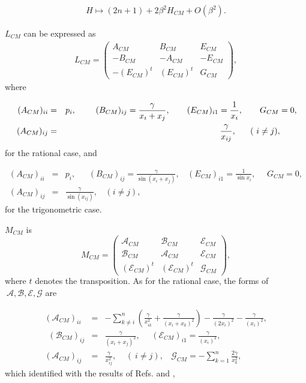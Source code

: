 \documentclass[a4paper,12pt]{article}
\begin{document}
\begin{eqnarray}
H\longmapsto (2n+1)+2\beta ^{2}H_{CM}+O(\beta ^{2}).
\end{eqnarray}

$L_{CM}$ can be expressed as
\begin{eqnarray}
L_{CM}=\left(
\begin{array}{lll}
A_{CM} & B_{CM} & E_{CM} \\
-B_{CM} & -A_{CM} & -E_{CM} \\
-(E_{CM})^{t} & (E_{CM})^{t} & G_{CM}
\end{array}
\right),
\end{eqnarray}
where

\begin{eqnarray}
\ (A_{CM})_{ii} &=&p_{i},\ \ \ \ \ \ \ (B_{CM})_{ij}=\frac{\gamma }{%
x_{i}+x_{j}},\ \ \ \ \ \ (E_{CM})_{i1}=\frac{1}{x_{i}},\ \ \ \ \ \ G_{CM}=0,
\nonumber \\
(A_{CM})_{ij} &=&\frac{\gamma }{x_{ij}},\ \ \ \ \ (\ i\neq j),\ \ \ \ \ \
\end{eqnarray}
for the rational case, and

\begin{eqnarray}
(A_{CM})_{ii} &=&p_{i},\ \ \ \ \ \ \ (B_{CM})_{ij}=\frac{\gamma }{\sin
(x_{i}+x_{j})},\ \ \ \ (E_{CM})_{i1}=\frac{1}{\sin x_{i}},\ \ \ \ \ \
G_{CM}=0,  \nonumber \\
(A_{CM})_{ij} &=&\frac{\gamma }{\sin (x_{ij})},\ \ \ \ (i\neq
j),
\end{eqnarray}
for the trigonometric case.

$M_{CM}$ is
\begin{equation}
M_{CM}=\left(
\begin{array}{lll}
\mathcal{A}_{CM} & \mathcal{B}_{CM} & \mathcal{E}_{CM} \\
\mathcal{B}_{CM} & \mathcal{A}_{CM} & \mathcal{E}_{CM} \\
(\mathcal{E}_{CM})^{t} & (\mathcal{E}_{CM})^{t} & \mathcal{G}_{CM}
\end{array}
\right) ,
\end{equation}
where $t$ denotes the transposition. As for the rational case, the forms of $%
\ \mathcal{A,B,E,G}$ are

\begin{eqnarray}
(\mathcal{A}_{CM})_{ii} &=&-\sum_{k\neq i}^{n}(\frac{\gamma }{x_{ik}^{2}}+%
\frac{\gamma }{(x_{i}+x_{k})^{2}})-\frac{\gamma }{(2x_{i})^{2}}-\frac{\gamma
}{(x_{i})^{2}},	 \nonumber \\
\ \ (\mathcal{B}_{CM})_{ij} &=&\frac{\gamma }{(x_{i}+x_{j})^{2}},\ \ \ \ \ \
(\mathcal{E}_{CM})_{i1}=\frac{\gamma }{(x_{i})^{2}},  \nonumber \\
(\mathcal{A}_{CM})_{ij} &=&\frac{\gamma }{x_{ij}^{2}},\ \ \ \ \ (\ i\neq
j),\ \ \ \ \mathcal{G}_{CM}=-\sum_{k=1}^{n}\frac{2\gamma }{x_{k}^{2}},
\end{eqnarray}
which identified with the results of Refs. \cite{op} and \cite{bcs},
\end{document}
